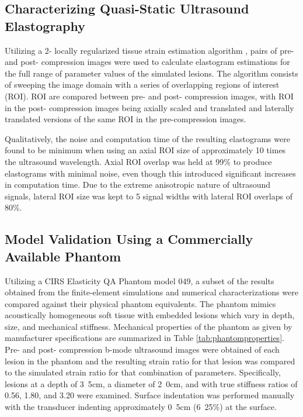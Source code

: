 		\subsection{Characterizing Quasi-Static Ultrasound Elastography}
			\label{sec:elastography_algorithm}
			Utilizing a 2- locally regularized tissue strain estimation algorithm \cite{brusseau08}, pairs of pre- and post- compression images were used to calculate elastogram estimations for the full range of parameter values of the simulated lesions. The algorithm consists of sweeping the image domain with a series of overlapping regions of interest (ROI). ROI are compared between pre- and post- compression images, with ROI in the post- compression images being axially scaled and translated and laterally translated versions of the same ROI in the pre-compression images.

			Qualitatively, the noise and computation time of the resulting elastograms were found to be minimum when using an axial ROI size of approximately 10 times the ultrasound wavelength. Axial ROI overlap was held at \unit{99}{\%} to produce elastograms with minimal noise, even though this introduced significant increases in computation time. Due to the extreme anisotropic nature of ultrasound signals, lateral ROI size was kept to 5 signal widths with lateral ROI overlaps of \unit{80}{\%}.

		\subsection{Model Validation Using a Commercially Available Phantom}
			Utilizing a CIRS Elasticity QA Phantom model 049, a subset of the results obtained from the finite-element simulations and numerical characterizations were compared against their physical phantom equivalents. The phantom mimics acoustically homogeneous soft tissue with embedded lesions which vary in depth, size, and mechanical stiffness. Mechanical properties of the phantom as given by manufacturer specifications are summarized in Table \ref{tab:phantomproperties}. Pre- and post- compression b-mode ultrasound images were obtained of each lesion in the phantom and the resulting strain ratio for that lesion was compared to the simulated strain ratio for that combination of parameters. Specifically, lesions at a depth of \unit{3.5}{cm}, a diameter of \unit{2.0}{cm}, and with true stiffness ratios of 0.56, 1.80, and 3.20 were examined. Surface indentation was performed manually with the transducer indenting approximately \unit{0.5}{cm} (\unit{6.25}{\%}) at the surface. 


